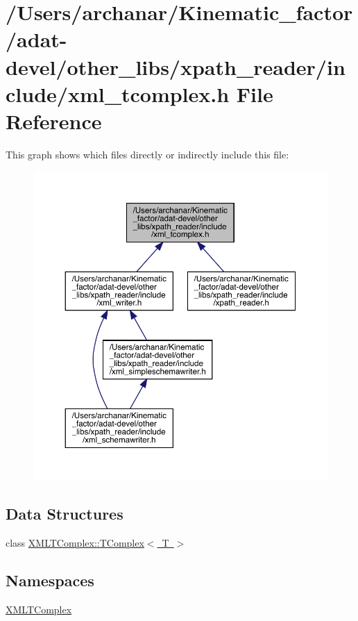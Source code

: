 \hypertarget{adat-devel_2other__libs_2xpath__reader_2include_2xml__tcomplex_8h}{}\section{/\+Users/archanar/\+Kinematic\+\_\+factor/adat-\/devel/other\+\_\+libs/xpath\+\_\+reader/include/xml\+\_\+tcomplex.h File Reference}
\label{adat-devel_2other__libs_2xpath__reader_2include_2xml__tcomplex_8h}
This graph shows which files directly or indirectly include this file\+:
\nopagebreak
\begin{figure}[H]
\begin{center}
\leavevmode
\includegraphics[width=350pt]{d1/df9/adat-devel_2other__libs_2xpath__reader_2include_2xml__tcomplex_8h__dep__incl}
\end{center}
\end{figure}
\subsection*{Data Structures}
\begin{DoxyCompactItemize}
\item 
class \mbox{\hyperlink{classXMLTComplex_1_1TComplex}{X\+M\+L\+T\+Complex\+::\+T\+Complex$<$ T $>$}}
\end{DoxyCompactItemize}
\subsection*{Namespaces}
\begin{DoxyCompactItemize}
\item 
 \mbox{\hyperlink{namespaceXMLTComplex}{X\+M\+L\+T\+Complex}}
\end{DoxyCompactItemize}

